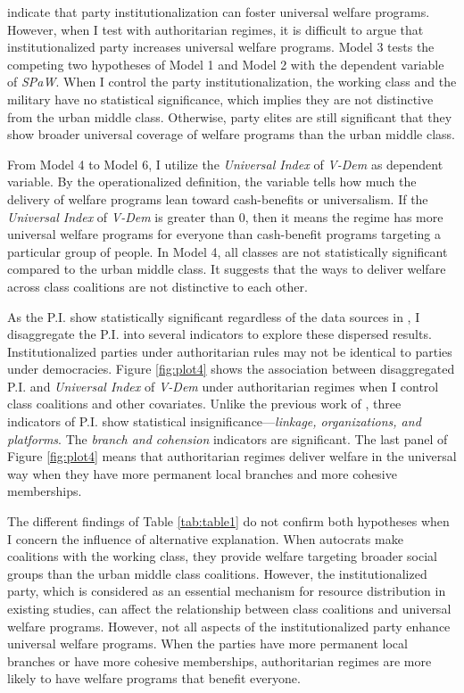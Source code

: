\documentclass[11pt]{article}
\begin{document}
\citet[16]{Rasmussen2019} indicate that party institutionalization can foster universal welfare programs. However, when I test with authoritarian regimes, it is difficult to argue that institutionalized party increases universal welfare programs. Model 3 tests the competing two hypotheses of Model 1 and Model 2 with the dependent variable of \textit{SPaW}. When I control the party institutionalization, the working class and the military have no statistical significance, which implies they are not distinctive from the urban middle class. Otherwise, party elites are still significant that they show broader universal coverage of welfare programs than the urban middle class.



From Model 4 to Model 6, I utilize the \textit{Universal Index} of \textit{V-Dem} as dependent variable. By the operationalized definition, the variable tells how much the delivery of welfare programs lean toward cash-benefits or universalism. If the \textit{Universal Index} of \textit{V-Dem} is greater than 0, then it means the regime has more universal welfare programs for everyone than cash-benefit programs targeting a particular group of people. In Model 4, all classes are not statistically significant compared to the urban middle class. It suggests that the ways to deliver welfare across class coalitions are not distinctive to each other.

As the P.I. show statistically significant regardless of the data sources in \citep{Rasmussen2019}, I disaggregate the P.I. into several indicators to explore these dispersed results. Institutionalized parties under authoritarian rules may not be identical to parties under democracies. Figure \ref{fig:plot4} shows the association between disaggregated P.I. and \textit{Universal Index} of \textit{V-Dem} under authoritarian regimes when I control class coalitions and other covariates. Unlike the previous work of \citet{Rasmussen2019}, three indicators of P.I. show statistical insignificance---\textit{linkage, organizations, and platforms}. The \textit{branch and cohension} indicators are significant. The last panel of Figure \ref{fig:plot4} means that authoritarian regimes deliver welfare in the universal way when they have more permanent local branches and more cohesive memberships. 

The different findings of Table \ref{tab:table1} do not confirm both hypotheses when I concern the influence of alternative explanation. When autocrats make coalitions with the working class, they provide welfare targeting broader social groups than the urban middle class coalitions. However, the institutionalized party, which is considered as an essential mechanism for resource distribution in existing studies, can affect the relationship between class coalitions and universal welfare programs. However, not all aspects of the institutionalized party enhance universal welfare programs. When the parties have more permanent local branches or have more cohesive memberships, authoritarian regimes are more likely to have welfare programs that benefit everyone.
\end{document}
